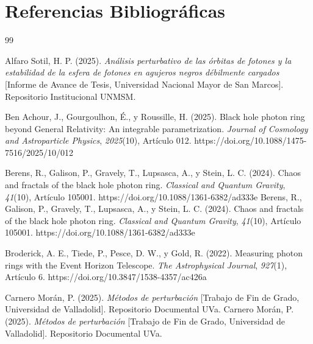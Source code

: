 \documentclass[twoside,onehalfspace]{./Portada/unmsmtesis}
\begin{document}
\newpage
\newpage
\chapter*{Referencias Bibliográficas}

\begin{thebibliography}{99}

 Alfaro Sotil, H. P. (2025). \textit{Análisis perturbativo de las órbitas de fotones y la estabilidad de la esfera de fotones en agujeros negros débilmente cargados} [Informe de Avance de Tesis, Universidad Nacional Mayor de San Marcos]. Repositorio Institucional UNMSM.

 Ben Achour, J., Gourgoulhon, É., y Roussille, H. (2025). Black hole photon ring beyond General Relativity: An integrable parametrization. \textit{Journal of Cosmology and Astroparticle Physics}, \textit{2025}(10), Artículo 012. https://doi.org/10.1088/1475-7516/2025/10/012

 Berens, R., Galison, P., Gravely, T., Lupsasca, A., y Stein, L. C. (2024). Chaos and fractals of the black hole photon ring. \textit{Classical and Quantum Gravity}, \textit{41}(10), Artículo 105001. https://doi.org/10.1088/1361-6382/ad333e
 Berens, R., Galison, P., Gravely, T., Lupsasca, A., y Stein, L. C. (2024). Chaos and fractals of the black hole photon ring. \textit{Classical and Quantum Gravity}, \textit{41}(10), Artículo 105001. https://doi.org/10.1088/1361-6382/ad333e

 Broderick, A. E., Tiede, P., Pesce, D. W., y Gold, R. (2022). Measuring photon rings with the Event Horizon Telescope. \textit{The Astrophysical Journal}, \textit{927}(1), Artículo 6. https://doi.org/10.3847/1538-4357/ac426a

 Carnero Morán, P. (2025). \textit{Métodos de perturbación} [Trabajo de Fin de Grado, Universidad de Valladolid]. Repositorio Documental UVa.
 Carnero Morán, P. (2025). \textit{Métodos de perturbación} [Trabajo de Fin de Grado, Universidad de Valladolid]. Repositorio Documental UVa.


\end{thebibliography}
\end{document}
